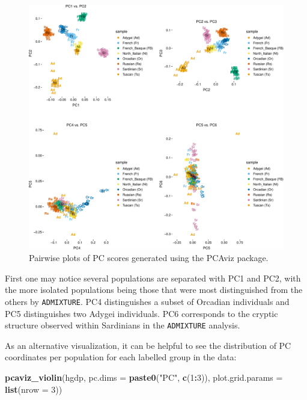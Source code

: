 \documentclass[smallextended]{svjour3}       %
\newenvironment{Shaded}{\begin{snugshade}}{\end{snugshade}}
\newcommand{\KeywordTok}[1]{\textcolor[rgb]{0.13,0.29,0.53}{\textbf{#1}}}
\newcommand{\DataTypeTok}[1]{\textcolor[rgb]{0.13,0.29,0.53}{#1}}
\newcommand{\DecValTok}[1]{\textcolor[rgb]{0.00,0.00,0.81}{#1}}
\newcommand{\StringTok}[1]{\textcolor[rgb]{0.31,0.60,0.02}{#1}}
\newcommand{\OperatorTok}[1]{\textcolor[rgb]{0.81,0.36,0.00}{\textbf{#1}}}
\newcommand{\NormalTok}[1]{#1}
\begin{document}
\begin{figure}
\includegraphics[width=1\linewidth]{plot/unnamed-chunk-20-1} \caption{Pairwise plots of PC scores generated using the PCAviz package.}\label{fig:unnamed-chunk-20}
\end{figure}

First one may notice several populations are separated with PC1 and PC2,
with the more isolated populations being those that were most
distinguished from the others by \texttt{ADMIXTURE}. PC4 distinguishes a
subset of Orcadian individuals and PC5 distinguishes two Adygei
individuals. PC6 corresponds to the cryptic structure observed within
Sardinians in the \texttt{ADMIXTURE} analysis.

As an alternative visualization, it can be helpful to see the
distribution of PC coordinates per population for each labelled group in
the data:

\begin{Shaded}
\begin{Highlighting}[]
\KeywordTok{pcaviz_violin}\NormalTok{(hgdp, }\DataTypeTok{pc.dims =} \KeywordTok{paste0}\NormalTok{(}\StringTok{"PC"}\NormalTok{, }\KeywordTok{c}\NormalTok{(}\DecValTok{1}\OperatorTok{:}\DecValTok{3}\NormalTok{)), }
              \DataTypeTok{plot.grid.params =} \KeywordTok{list}\NormalTok{(}\DataTypeTok{nrow =} \DecValTok{3}\NormalTok{))}
\end{Highlighting}
\end{Shaded}
\end{document}
